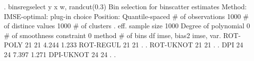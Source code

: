 . binsregselect y x w, randcut(0.3)
{\smallskip}
{\smallskip}
Bin selection for binscatter estimates
Method: IMSE-optimal: plug-in choice
Position: Quantile-spaced
{\smallskip}
          \# of observations {\VBAR}    1000
       \# of distince values {\VBAR}    1000
              \# of clusters {\VBAR}       .
           eff. sample size {\VBAR}    1000
       Degree of polynomial {\VBAR}       0
 \# of smoothness constraint {\VBAR}       0
{\smallskip}
    method    {\VBAR}  \# of bins {\VBAR}     df   {\VBAR} imse, bias{\caret}2 {\VBAR}  imse, var.  
   ROT-POLY   {\VBAR}      21    {\VBAR}     21   {\VBAR}    4.244     {\VBAR}    1.233
   ROT-REGUL  {\VBAR}      21    {\VBAR}     21   {\VBAR}        .     {\VBAR}        .
   ROT-UKNOT  {\VBAR}      21    {\VBAR}     21   {\VBAR}        .     {\VBAR}        .
      DPI     {\VBAR}      24    {\VBAR}     24   {\VBAR}    7.397     {\VBAR}    1.271
   DPI-UKNOT  {\VBAR}      24    {\VBAR}     24   {\VBAR}        .     {\VBAR}        .
